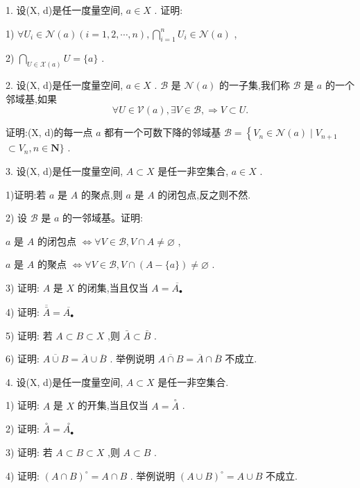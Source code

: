 1. 设(X, d)是任一度量空间, $a \in  X$ . 证明:

1) $\forall {U}_{i} \in  \mathcal{N}\left( a\right) \left( {i = 1,2,\cdots ,n}\right) ,\mathop{\bigcap }\limits_{{i = 1}}^{n}{U}_{i} \in  \mathcal{N}\left( a\right)$ ,

2) $\mathop{\bigcap }\limits_{{U \in  \mathcal{X}\left( a\right) }}U = \{ a\}$ .

2. 设(X, d)是任一度量空间, $a \in  X$ . $\mathcal{B}$ 是 $\mathcal{N}\left( a\right)$ 的一子集,我们称 $\mathcal{B}$ 是 $a$ 的一个邻域基,如果
$$\forall U \in  \mathcal{V}\left( a\right) ,\exists V \in  \mathcal{B}, \Rightarrow  V \subset  U.$$

证明:(X, d)的每一点 $a$ 都有一个可数下降的邻域基 $\mathcal{B} = \left\{  {{V}_{n} \in  \mathcal{N}\left( a\right)  \mid  {V}_{n + 1}}\right.$  $\subset  {V}_{n},n \in  \mathbf{N}\}$ .

3. 设(X, d)是任一度量空间, $A \subset  X$ 是任一非空集合, $a \in  X$ .

1)证明:若 $a$ 是 $A$ 的聚点,则 $a$ 是 $A$ 的闭包点,反之则不然.

2) 设 $\mathcal{B}$ 是 $a$ 的一邻域基。证明:

$a$ 是 $A$ 的闭包点 $\Leftrightarrow  \forall V \in  \mathcal{B},V \cap  A \neq  \varnothing$ ,

$a$ 是 $A$ 的聚点 $\Leftrightarrow  \forall V \in  \mathcal{B},V \cap  \left( {A-\{ a\} }\right)  \neq  \varnothing$ .

3) 证明: $A$ 是 $X$ 的闭集,当且仅当 $A = \overline{{A}_{ \bullet  }}$

4) 证明: $\overline{\bar{A}} = \overline{{A}_{ \bullet  }}$

5) 证明: 若 $A \subset  B \subset  X$ ,则 $\bar{A} \subset  \bar{B}$ .

6) 证明: $\overline{A \cup  B} = \overline{A} \cup  \overline{B}$ . 举例说明 $\overline{A \cap  B} = \overline{A} \cap  \overline{B}$ 不成立.

4. 设(X, d)是任一度量空间, $A \subset  X$ 是任一非空集合.

1) 证明: $A$ 是 $X$ 的开集,当且仅当 $A = \overset{ \circ  }{A}$ .

2) 证明: $\overset{ \circ  }{A} = \overset{ \circ  }{{A}_{ \bullet  }}$

3) 证明: 若 $A \subset  B \subset  X$ ,则 $A \subset  B$ .

4) 证明: ${\left( A \cap  B\right) }^{ \circ  } = A \cap  B$ . 举例说明 ${\left( A \cup  B\right) }^{ \circ  } = A \cup  B$ 不成立.

